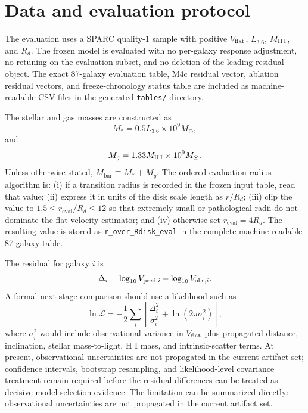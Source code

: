 \documentclass[aps,prd,preprint,nofootinbib,superscriptaddress]{revtex4-2}
\begin{document}
\section{Data and evaluation protocol}

The evaluation uses a SPARC quality-1 sample with positive $V_{\rm flat}$, $L_{3.6}$, $M_{\rm H\,I}$, and $R_d$. The frozen model is evaluated with no per-galaxy response adjustment, no retuning on the evaluation subset, and no deletion of the leading residual object. The exact 87-galaxy evaluation table, M4c residual vector, ablation residual vectors, and freeze-chronology status table are included as machine-readable CSV files in the generated \texttt{tables/} directory.

The stellar and gas masses are constructed as
\begin{equation}
M_* = 0.5 L_{3.6} \times 10^9 M_\odot,
\end{equation}
and
\begin{equation}
M_g = 1.33 M_{\rm H\,I} \times 10^9 M_\odot.
\end{equation}
Unless otherwise stated, $M_{\mathrm{bar}} \equiv M_* + M_g$. The ordered evaluation-radius algorithm is: (i) if a transition radius is recorded in the frozen input table, read that value; (ii) express it in units of the disk scale length as $r/R_d$; (iii) clip the value to $1.5\le r_{\mathrm{eval}}/R_d\le12$ so that extremely small or pathological radii do not dominate the flat-velocity estimator; and (iv) otherwise set $r_{\mathrm{eval}}=4R_d$. The resulting value is stored as \texttt{r\_over\_Rdisk\_eval} in the complete machine-readable 87-galaxy table.

The residual for galaxy $i$ is
\begin{equation}
\Delta_i=\log_{10}V_{{\rm pred},i}-\log_{10}V_{{\rm obs},i}.
\end{equation}
A formal next-stage comparison should use a likelihood such as
\begin{equation}
\ln \mathcal{L}=-\frac{1}{2}\sum_i\left[\frac{\Delta_i^2}{\sigma_i^2}+\ln(2\pi\sigma_i^2)\right],
\end{equation}
where $\sigma_i^2$ would include observational variance in $V_{\rm flat}$ plus propagated distance, inclination, stellar mass-to-light, H I mass, and intrinsic-scatter terms. At present, observational uncertainties are not propagated in the current artifact set; confidence intervals, bootstrap resampling, and likelihood-level covariance treatment remain required before the residual differences can be treated as decisive model-selection evidence. The limitation can be summarized directly: observational uncertainties are not propagated in the current artifact set.
\end{document}
